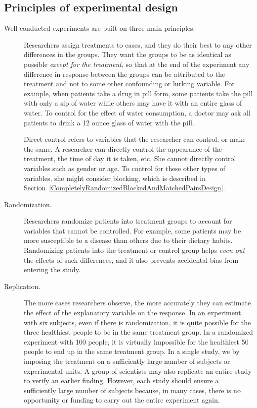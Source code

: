\subsection{Principles of experimental design}
\label{experimentalDesignPrinciples}

Well-conducted experiments are built on three main principles.

\begin{description}
\item[] Researchers assign treatments to cases, and they do their best to  any other differences in the groups. They want the groups to be as identical as possible \emph{except for the treatment}, so that at the end of the experiment any difference in response between the groups can be attributed to the treatment and not to some other confounding or lurking variable. For example, when patients take a drug in pill form, some patients take the pill with only a sip of water while others may have it with an entire glass of water. To control for the effect of water consumption, a doctor may ask all patients to drink a 12 ounce glass of water with the pill.

Direct control refers to variables that the researcher can control, or make the same. A researcher can directly control the appearance of the treatment, the time of day it is taken, etc. She cannot directly control variables such as gender or age. To control for these other types of variables, she might consider blocking, which is described in Section~\ref{CompletelyRandomizedBlockedAndMatchedPairsDesign}.

\item[Randomization.] Researchers randomize patients into treatment groups to account for variables that cannot be controlled. For example, some patients may be more susceptible to a disease than others due to their dietary habits. Randomizing patients into the treatment or control group helps \emph{even out} the effects of such differences, and it also prevents accidental bias from entering the study.

\item[Replication.] The more cases researchers observe, the more accurately they can estimate the effect of the explanatory variable on the response. In an experiment with six subjects, even if there is randomization, it is quite possible for the three healthiest people to be in the same treatment group. In a randomized experiment with 100 people, it is virtually impossible for the healthiest 50 people to end up in the same treatment group. In a single study, we  by imposing the treatment on a sufficiently large number of subjects or experimental units. A group of scientists may also replicate an entire study to verify an earlier finding. However, each study should ensure a sufficiently large number of subjects because, in many cases, there is no opportunity or funding to carry out the entire experiment again.
\end{description}

